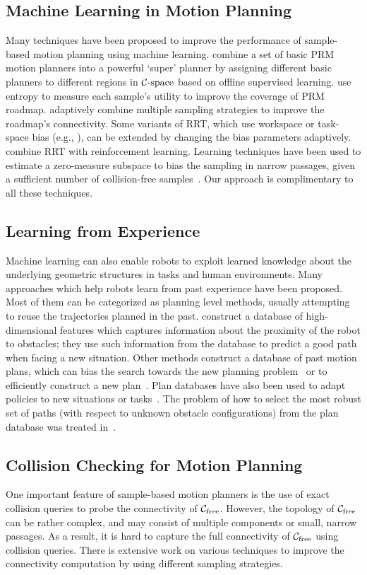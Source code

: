\subsection{Machine Learning in Motion Planning}
Many techniques have been proposed to improve the performance of sample-based motion planning using machine learning. \cite{Marco:2004:WAFR} combine a set of basic PRM motion planners into a powerful `super' planner by assigning different basic planners to different regions in $\mathcal C\text{-space}$ based on offline supervised learning. \cite{Burns:2003:ITC,Burns:2005:SQE,Burns-RSS-05} use entropy to measure each sample's utility to improve the coverage of PRM roadmap. \cite{Hsu:2005} adaptively combine multiple sampling strategies to improve the roadmap's connectivity. Some variants of RRT, which use workspace or task-space bias (e.g., \cite{Diankov:2008}), can be extended by changing the bias parameters adaptively.
\cite{Scholz:2010} combine RRT with reinforcement learning. Learning techniques have been used to estimate a zero-measure subspace to bias the sampling in narrow passages, given a sufficient number of collision-free samples~\cite{Dalibard:2011}. Our approach is complimentary to all these techniques.

\subsection{Learning from Experience}
Machine learning can also enable robots to exploit learned knowledge about the underlying geometric structures in tasks and human environments. Many approaches which help robots learn from past experience have been proposed. Most of them can be categorized as planning level methods, usually attempting to reuse the trajectories planned in the past. \cite{Jetchev:2010} construct a database of high-dimensional features which captures information about the proximity of the robot to obstacles; they use such information from the database to predict a good path when facing a new situation.
Other methods construct a database of past motion plans, which can bias the search towards the new planning problem~\cite{Jiang:2007} or to efficiently construct a new plan~\cite{Berenson:2012, Mike:2012}. Plan databases have also been used to adapt policies to new situations or tasks~\cite{Stolle:2006}. The problem of how to select the
most robust set of paths (with respect to unknown obstacle configurations) from the plan database was treated in~\cite{Branicky:2008}.

\subsection{Collision Checking for Motion Planning}
One important feature of sample-based motion planners is the use of exact collision queries to probe the connectivity of $\mathcal C_{\text{free}}$. However, the topology of $\mathcal C_{\text{free}}$ can be rather complex, and may consist of multiple components or small, narrow passages. As a result, it is hard to capture the full connectivity of $\mathcal C_{\text{free}}$ using collision queries. There is extensive work on various techniques to improve the connectivity computation by using different sampling strategies.


